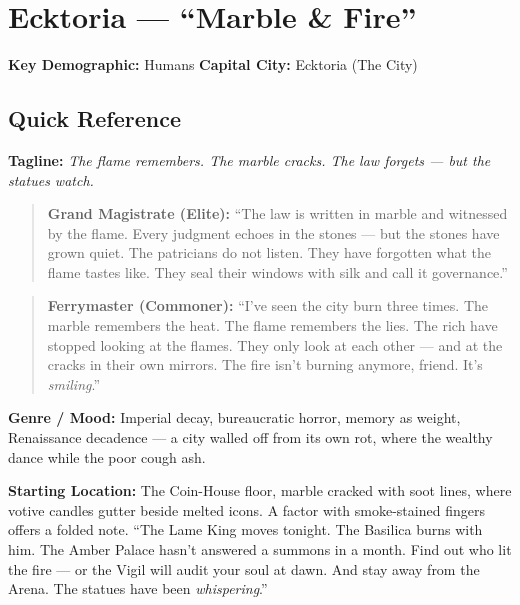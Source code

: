 \section{Ecktoria --- ``Marble \& Fire''}
\label{chap:ecktoria}

\textbf{Key Demographic: } Humans
\textbf{Capital City: } Ecktoria (The City)

\subsection*{Quick Reference}
\textbf{Tagline:} \textit{The flame remembers. The marble cracks. The law forgets --- but the statues watch.}

\begin{quote}
  \textbf{Grand Magistrate (Elite):}  
  ``The law is written in marble and witnessed by the flame. Every judgment echoes in the stones --- but the stones have grown quiet. The patricians do not listen. They have forgotten what the flame tastes like. They seal their windows with silk and call it governance.''
\end{quote}

\begin{quote}
  \textbf{Ferrymaster (Commoner):}  
  ``I've seen the city burn three times. The marble remembers the heat. The flame remembers the lies. The rich have stopped looking at the flames. They only look at each other --- and at the cracks in their own mirrors. The fire isn't burning anymore, friend. It's \textit{smiling}.''
\end{quote}

\textbf{Genre / Mood:} Imperial decay, bureaucratic horror, memory as weight, Renaissance decadence --- a city walled off from its own rot, where the wealthy dance while the poor cough ash.

\textbf{Starting Location:} The Coin-House floor, marble cracked with soot lines, where votive candles gutter beside melted icons. A factor with smoke-stained fingers offers a folded note. ``The Lame King moves tonight. The Basilica burns with him. The Amber Palace hasn't answered a summons in a month. Find out who lit the fire --- or the Vigil will audit your soul at dawn. And stay away from the Arena. The statues have been \textit{whispering}.''

